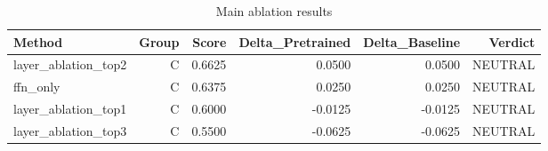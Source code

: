 \begin{table}[htbp]
\centering
\caption{Main ablation results}
\label{tab:main-results}
\begin{tabular}{lrrrrr}
\toprule
\textbf{Method} & \textbf{Group} & \textbf{Score} & \textbf{Delta\_Pretrained} & \textbf{Delta\_Baseline} & \textbf{Verdict} \\
\midrule
layer\_ablation\_top2 & C & 0.6625 & 0.0500 & 0.0500 & NEUTRAL \\
ffn\_only & C & 0.6375 & 0.0250 & 0.0250 & NEUTRAL \\
layer\_ablation\_top1 & C & 0.6000 & -0.0125 & -0.0125 & NEUTRAL \\
layer\_ablation\_top3 & C & 0.5500 & -0.0625 & -0.0625 & NEUTRAL \\
\bottomrule
\end{tabular}
\end{table}
